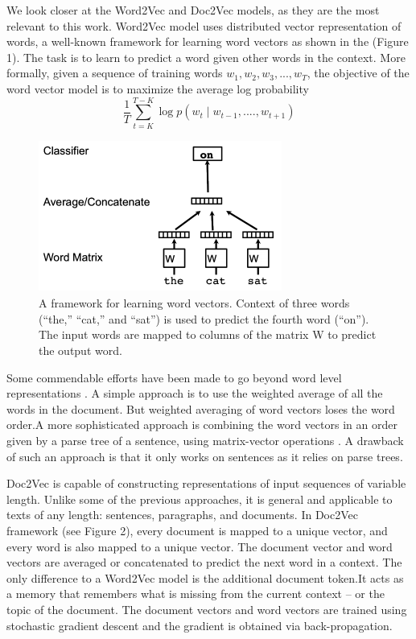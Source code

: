 \documentclass[12pt,a4paper] {article}
\begin{document}
We look closer at the Word2Vec and Doc2Vec models, as they are the most relevant to this work. Word2Vec model uses distributed vector representation of words, a well-known framework for learning word vectors as shown in the (Figure 1). The task is to learn to predict a word given other words in the context.
More formally, given a sequence of training words
$w_{1}, w_{2}, w_{3}, ..., w_{T} $, the objective of the word vector model is to maximize the average log probability
\\
\begin{equation}
\frac{1}{T} \sum_{t=K}^{T-K} \log p(w_{t} \mid w_{t-1},....,w_{t+1}) 
\end{equation}

	\begin{figure}[h]
		\centering
		\includegraphics[width=8cm, height=5cm]{w2v.png}
		\caption[]{A framework for learning word vectors. Context of
			three words (“the,” “cat,” and “sat”) is used to predict the fourth
			word (“on”). The input words are mapped to columns of the matrix
			W to predict the output word.}
		\label{fig:Word2Vec model}
	\end{figure}
Some commendable efforts have been made to go beyond word level representations  \cite{mitchell2010composition}  \cite{zanzotto2010estimating} 
\cite{yessenalina2011compositional}  \cite{grefenstette2013multi}  \cite{mikolov2013distributed}. A simple approach is to use the weighted average of all the words in the document. But weighted averaging of word vectors loses the word order.A more sophisticated approach is combining the word vectors
in an order given by a parse tree of a sentence, using
matrix-vector operations \cite{socher2011dynamic}. A drawback of such an approach is that it only works on sentences as it relies on parse trees.

Doc2Vec is capable of constructing representations
of input sequences of variable length. Unlike some of the
previous approaches, it is general and applicable to texts of
any length: sentences, paragraphs, and documents. In Doc2Vec framework (see Figure 2), every
document is mapped to a unique vector, and every word is also mapped to a
unique vector. The document vector and word vectors are averaged or concatenated
to predict the next word in a context. The only difference to a Word2Vec model is the additional document token.It
acts as a memory that remembers what is missing from the
current context – or the topic of the document. The document vectors and word vectors are trained using stochastic gradient descent and the gradient is obtained via back-propagation.
\end{document}
